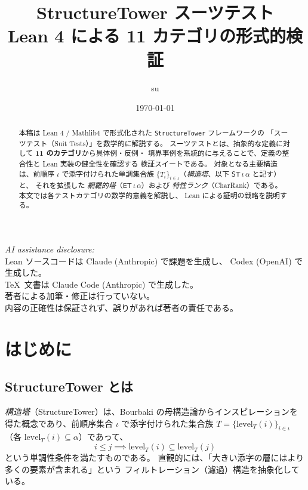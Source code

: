 \documentclass[a4paper,11pt]{ltjsarticle}
\theoremstyle{definition}
\theoremstyle{plain}
\theoremstyle{remark}
\newcommand{\ST}{\mathsf{ST}}    %
\newcommand{\ET}{\mathsf{ET}}    %
\newcommand{\lev}{\mathrm{level}}
\begin{document}
\title{%
  {\LARGE\sffamily\bfseries StructureTower スーツテスト}\\[0.5em]
  {\large\sffamily Lean 4 による 11 カテゴリの形式的検証}%
}
\author{su}
\date{\today}
\maketitle

\begin{center}
\small
\textit{AI assistance disclosure:}\\
Lean ソースコードは Claude (Anthropic) で課題を生成し、
Codex (OpenAI) で生成した。\\
\TeX\ 文書は Claude Code (Anthropic) で生成した。\\
著者による加筆・修正は行っていない。\\
内容の正確性は保証されず、誤りがあれば著者の責任である。
\end{center}

\vspace{1em}

\begin{abstract}
本稿は Lean 4 / Mathlib4 で形式化された \texttt{StructureTower} フレームワークの
「スーツテスト（Suit Tests）」を数学的に解説する。
スーツテストとは、抽象的な定義に対して \textbf{11 のカテゴリ}から具体例・反例・
境界事例を系統的に与えることで、定義の整合性と Lean 実装の健全性を確認する
検証スイートである。
対象となる主要構造は、前順序 $\iota$ で添字付けられた単調集合族
$\{T_i\}_{i \in \iota}$（\emph{構造塔}、以下 $\ST\,\iota\,\alpha$ と記す）と、
それを拡張した \emph{網羅的塔}（$\ET\,\iota\,\alpha$）および
\emph{特性ランク}（CharRank）である。
本文では各テストカテゴリの数学的意義を解説し、
Lean による証明の戦略を説明する。
\end{abstract}

\tableofcontents
\newpage

\section{はじめに}\label{sec:intro}

\subsection{StructureTower とは}

\emph{構造塔}（StructureTower）は、Bourbaki の母構造論からインスピレーションを
得た概念であり、前順序集合 $\iota$ で添字付けられた集合族
$T = \{\lev_T(i)\}_{i \in \iota}$（各 $\lev_T(i) \subseteq \alpha$）であって、
\[
  i \leq j \implies \lev_T(i) \subseteq \lev_T(j)
\]
という単調性条件を満たすものである。
直観的には、「大きい添字の層にはより多くの要素が含まれる」という
フィルトレーション（濾過）構造を抽象化している。
\end{document}
